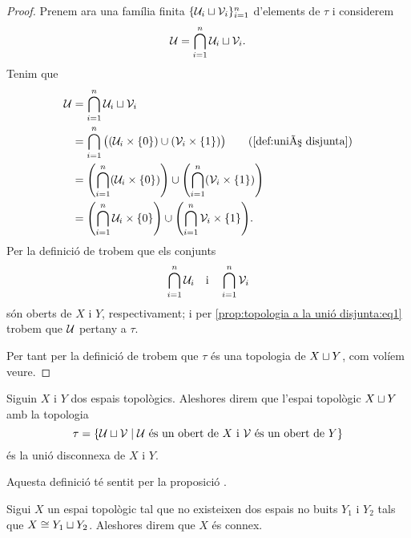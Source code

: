 \documentclass[../Apunts.tex]{subfiles}
\begin{document}
\begin{proposition}
\begin{proof}
			Prenem ara una família finita \(\{\mathcal{U}_{i}\sqcup\mathcal{V}_{i}\}_{i=1}^{n}\) d'elements de \(\tau\) i considerem
			\[\mathcal{U}=\bigcap_{i=1}^{n}\mathcal{U}_{i}\sqcup\mathcal{V}_{i}.\]
			Tenim que
			\begin{align*}
				\obert{U}&=\bigcap_{i=1}^{n}\obert{U}_{i}\uniodisjunta\obert{V}_{i} \\
				&=\bigcap_{i=1}^{n}\big((\obert{U}_{i}\times\{0\})\cup(\obert{V}_{i}\times\{1\})\big) \tag{\ref{def:unió disjunta}} \\
				&=\left(\bigcap_{i=1}^{n}(\obert{U}_{i}\times\{0\})\right)\cup\left(\bigcap_{i=1}^{n}(\obert{V}_{i}\times\{1\})\right) \\
				&=\left(\bigcap_{i=1}^{n}\obert{U}_{i}\times\{0\}\right)\cup\left(\bigcap_{i=1}^{n}\obert{V}_{i}\times\{1\}\right).
			\end{align*}
			Per la definició de  trobem que els conjunts
			\[\bigcap_{i=1}^{n}\mathcal{U}_{i}\quad\text{i}\quad\bigcap_{i=1}^{n}\mathcal{V}_{i}\]
			són oberts de \(X\) i \(Y\), respectivament; i per \eqref{prop:topologia a la unió disjunta:eq1} trobem que \(\mathcal{U}\) pertany a \(\tau\).
			
			Per tant per la definició de  trobem que \(\tau\) és una topologia de \(X\sqcup Y\), com volíem veure.
		\end{proof}
	\end{proposition}
	\begin{definition}
		\label{def:unió disconnexa}
		Siguin \(X\) i \(Y\) dos espais topològics. Aleshores direm que l'espai topològic \(X\sqcup Y\) amb la topologia
		\[\tau=\{\mathcal{U}\sqcup\mathcal{V}\mid\mathcal{U}\text{ és un obert de }X\text{ i }\mathcal{V}\text{ és un obert de }Y\}\]
		és la unió disconnexa de \(X\) i \(Y\).
		
		Aquesta definició té sentit per la proposició .
	\end{definition}
	\begin{definition}
		\label{def:espai connex}
		Sigui \(X\) un espai topològic tal que no existeixen dos espais no buits \(Y_{1}\) i \(Y_{2}\) tals que \(X\cong Y_{1}\sqcup Y_{2}\). Aleshores direm que \(X\) és connex.
	\end{definition}
\end{document}
